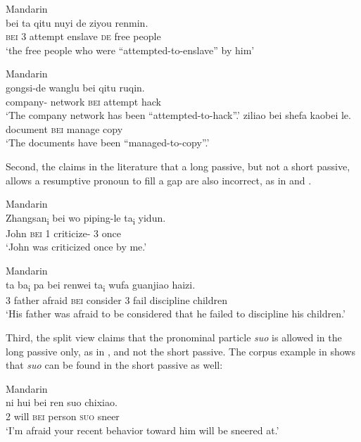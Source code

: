 \documentclass[output=paper,chinesefont,hidelinks]{langscibook}
\begin{document}
\ea%
    \label{ex:Sinitic:25}Mandarin\\
    \gll bei  ta  qitu    nuyi      de  ziyou  renmin.\\
         \textsc{bei}  {3\SG}  attempt  enslave  \textsc{de}   free  people\\
    \glt `the free people who were ``attempted-to-enslave'' by him'
    \z

\newpage
\ea%
    \label{ex:Sinitic:26}Mandarin\\
\ea    \gll gongsi-de        wanglu  bei  qitu    ruqin.\\
         company-{\POSS}    network   \textsc{bei}   attempt  hack\\
         \glt`The company network has been ``attempted-to-hack''.'
\ex \gll ziliao    bei  shefa    kaobei  le.\\
document  \textsc{bei}  manage  copy  \PRF\\
\glt`The documents have been ``managed-to-copy''.'
    \z\z

  Second, the claims in the literature that a long passive, but not a short passive, allows a resumptive pronoun to fill a gap are also incorrect, as in  and .

\ea%
    \label{ex:Sinitic:27}Mandarin\\
    \gll Zhangsan\textsubscript{i} bei  wo  piping-le  ta\textsubscript{i} yidun.\\
         John           \textsc{bei}  {1\SG}  criticize-{\PFV}   {3\SG}  once\\
    \glt `John was criticized once by me.'
    \z

\ea%
    \label{ex:Sinitic:28}Mandarin\\
    \gll ta  ba\textsubscript{i} pa  bei   renwei   ta\textsubscript{i} wufa  guanjiao     haizi.\\
      {3\SG}  father   afraid  \textsc{bei} consider  {3\SG}  fail   discipline   children\\
    \glt`His father was afraid to be considered that he failed to discipline his children.'
    \z

  Third, the split view claims that the pronominal particle \textit{suo} is allowed in the long passive only, as in , and not the short passive. The corpus example in  shows that \textit{suo} can be found in the short passive as well:

\ea%
    \label{ex:Sinitic:29}Mandarin\\
    \gll ni  hui  bei  ren  suo   chixiao.\\
        {2\SG}  will  \textsc{bei}  person  \textsc{suo}  sneer\\
    \glt`I'm afraid your recent behavior toward him will be sneered at.'
    \z
\end{document}
